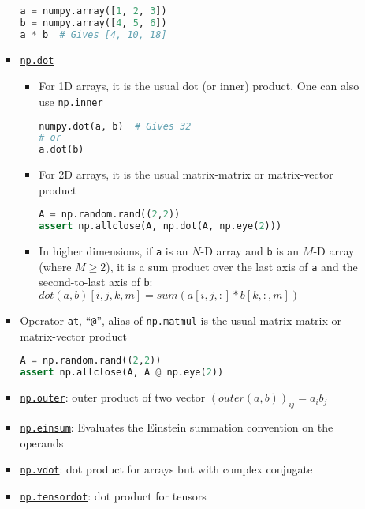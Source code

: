 \documentclass[a4paper,12pt,%
              final%
              ]{article}
\begin{document}
\begin{itemize}
\begin{itemize}
\begin{itemize}
\begin{lstlisting}[language=python]
a = numpy.array([1, 2, 3])
b = numpy.array([4, 5, 6])
a * b  # Gives [4, 10, 18]
\end{lstlisting}
          \item \href{https://numpy.org/doc/stable/reference/generated/numpy.dot.html}{\texttt{np.dot}}
            \begin{itemize}
              \item For 1D arrays, it is the usual dot (or inner) product. One can also use \texttt{np.inner}
\begin{lstlisting}[language=python]
numpy.dot(a, b)  # Gives 32
# or
a.dot(b)
\end{lstlisting}
              \item For 2D arrays, it is the usual matrix-matrix or matrix-vector product
\begin{lstlisting}[language=python]
A = np.random.rand((2,2))
assert np.allclose(A, np.dot(A, np.eye(2)))
\end{lstlisting}
              \item In higher dimensions, if \texttt{a} is an $N$-D array and \texttt{b} is an $M$-D array (where $M\geq2$), it is a sum product over the last axis of \texttt{a} and the second-to-last axis of \texttt{b}: $dot(a, b)[i,j,k,m] = sum(a[i,j,:] * b[k,:,m])$
            \end{itemize}
          \item Operator \texttt{at}, ``\verb|@|'', alias of \texttt{np.matmul} is the usual matrix-matrix or matrix-vector product
\begin{lstlisting}[language=python]
A = np.random.rand((2,2))
assert np.allclose(A, A @ np.eye(2))
\end{lstlisting}
          \item \href{https://numpy.org/doc/stable/reference/generated/numpy.outer.html}{\texttt{np.outer}}: outer product of two vector $(outer(a, b))_{ij} = a_i b_j$
          \item \href{https://numpy.org/doc/stable/reference/generated/numpy.einsum.html#numpy.einsum}{\texttt{np.einsum}}: Evaluates the Einstein summation convention on the operands
          \item \href{https://numpy.org/doc/stable/reference/generated/numpy.vdot.html}{\texttt{np.vdot}}: dot product for arrays but with complex conjugate
          \item \href{https://numpy.org/doc/stable/reference/generated/numpy.tensordot.html}{\texttt{np.tensordot}}: dot product for tensors

\end{itemize}
\end{itemize}
\end{itemize}
\end{document}
